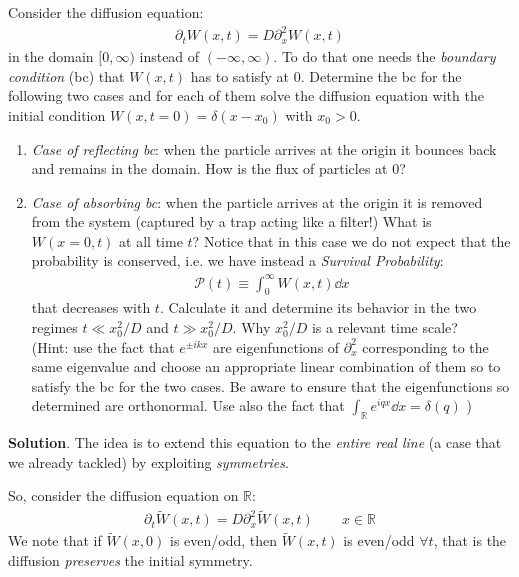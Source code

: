 \documentclass[../template.tex]{subfiles}
\begin{document}
\begin{exo}
    Consider the diffusion equation:
    \begin{align*}
        \partial_t W(x,t) = D \partial_x^2 W(x,t)
    \end{align*}
    in the domain $[0,\infty)$ instead of $(-\infty,\infty)$. To do that one needs the \textit{boundary condition} (bc) that $W(x,t)$ has to satisfy at $0$. Determine the bc for the following two cases and for each of them solve the diffusion equation with the initial condition $W(x,t=0) = \delta(x-x_0 )$ with $x_0 > 0$.
    \begin{enumerate}
        \item \textit{Case of reflecting bc}: when the particle arrives at the origin it bounces back and remains in the domain. How is the flux of particles at $0$?
        \item \textit{Case of absorbing bc}: when the particle arrives at the origin it is removed from the system (captured by a trap acting like a filter!) What is $W(x=0, t)$ at all time $t$? Notice that in this case we do not expect that the probability is conserved, i.e. we have instead a \textit{Survival Probability}:
        \begin{align*}
            \mathcal{P}(t) \equiv \int_0^\infty W(x,t) \dd{x}    
        \end{align*}      
        that decreases with $t$. Calculate it and determine its behavior in the two regimes $t \ll x_0^2/D$ and $t \gg x_0^2/D$. Why $x_0^2/D$ is a relevant time scale?\\
        (Hint: use the fact that $e^{\pm ikx}$ are eigenfunctions of $\partial_x^2$ corresponding to the same eigenvalue and choose an appropriate linear combination of them so to satisfy the bc for the two cases. Be aware to ensure that the eigenfunctions so determined are orthonormal. Use also the fact that $\int_{\mathbb{R}} e^{iqx} \dd{x} = \delta(q)$  )
    \end{enumerate}
    
    \medskip

    \textbf{Solution}. The idea is to extend this equation to the \textit{entire real line} (a case that we already tackled) by exploiting \textit{symmetries}.   

    So, consider the diffusion equation on $\mathbb{R}$:
    \begin{align*}
        \partial_t \tilde{W}(x,t) = D\partial_x^2 \tilde{W}(x,t) \qquad x \in \mathbb{R}
    \end{align*}
    We note that if $\tilde{W}(x,0)$ is even/odd, then $\tilde{W}(x,t)$ is even/odd $\forall t$, that is the diffusion \textit{preserves} the initial symmetry.
    

\end{exo}
\end{document}
